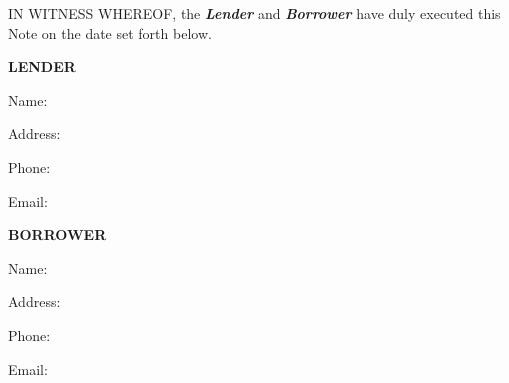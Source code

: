 
IN WITNESS WHEREOF, the \textbf{\textit{Lender}} and \textbf{\textit{Borrower}} have duly executed this Note on the date set forth below.


\vspace{0.5in}

\hspace{3in}
\textbf{LENDER}

\vspace{0.2in}
\hspace{3in}
Name: \LenderName{}

\vspace{0.2in}

\hspace{3in}
\parbox{3.5in}{
Address: \LenderAddress{}
}
\vspace{0.2in}

\hspace{3in}
Phone: \LenderPhone{}

\vspace{0.2in}

\hspace{3in}
Email: \LenderEmail{}


\vspace{0.5in}

\hspace{3in}
\textbf{BORROWER}

\vspace{0.2in}
\hspace{3in}
Name: \BorrowerName{}

\vspace{0.2in}

\hspace{3in}
\parbox{3.5in}{
Address: \BorrowerAddress{}
}
\vspace{0.2in}

\hspace{3in}
Phone: \BorrowerPhone{}

\vspace{0.2in}

\hspace{3in}
Email: \BorrowerEmail{}

